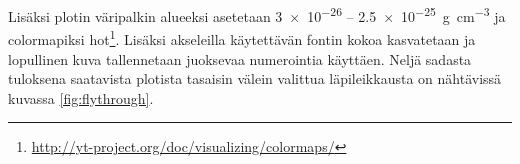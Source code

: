 \documentclass[12pt,a4paper]{article}
\begin{document}
Lisäksi plotin väripalkin alueeksi asetetaan \SI{3e-26}{} -- \SI{2.5e-25}{\gram\per\cubic\centi\metre} %
ja colormapiksi hot\footnote{\url{http://yt-project.org/doc/visualizing/colormaps/}}. Lisäksi akseleilla käytettävän fontin kokoa kasvatetaan ja lopullinen kuva tallennetaan juoksevaa numerointia käyttäen. Neljä sadasta tuloksena saatavista plotista tasaisin välein valittua läpileikkausta on nähtävissä kuvassa \ref{fig:flythrough}.

\begin{minipage}{\linewidth}

\end{minipage}
\end{document}
